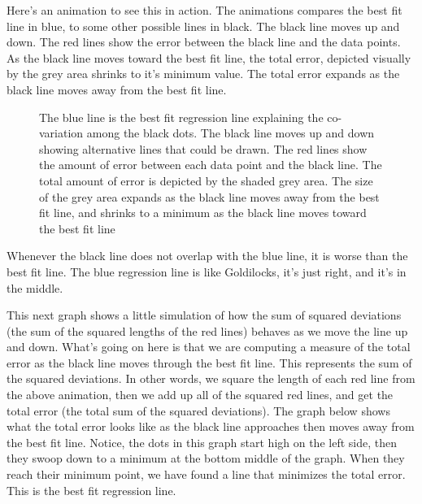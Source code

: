 \documentclass[
]{book}
\makeatletter
\newcommand*\pandocbounded[1]{%
  \sbox\pandoc@box{#1}%
  \Gscale@div\@tempa{\textheight}{\dimexpr\ht\pandoc@box+\dp\pandoc@box\relax}%
  \Gscale@div\@tempb{\linewidth}{\wd\pandoc@box}%
  \ifdim\@tempb\p@<\@tempa\p@\let\@tempa\@tempb\fi%
  \ifdim\@tempa\p@<\p@\scalebox{\@tempa}{\usebox\pandoc@box}%
  \else\usebox{\pandoc@box}%
  \fi%
}
\makeatother
\begin{document}
Here's an animation to see this in action. The animations compares the best fit line in blue, to some other possible lines in black. The black line moves up and down. The red lines show the error between the black line and the data points. As the black line moves toward the best fit line, the total error, depicted visually by the grey area shrinks to it's minimum value. The total error expands as the black line moves away from the best fit line.

\begin{figure}
\centering
\pandocbounded{\texttt{[image: gifs/regression-1.gif]}}
\caption{\label{fig:3regressionGIF}The blue line is the best fit regression line explaining the co-variation among the black dots. The black line moves up and down showing alternative lines that could be drawn. The red lines show the amount of error between each data point and the black line. The total amount of error is depicted by the shaded grey area. The size of the grey area expands as the black line moves away from the best fit line, and shrinks to a minimum as the black line moves toward the best fit line}
\end{figure}

Whenever the black line does not overlap with the blue line, it is worse than the best fit line. The blue regression line is like Goldilocks, it's just right, and it's in the middle.

This next graph shows a little simulation of how the sum of squared deviations (the sum of the squared lengths of the red lines) behaves as we move the line up and down. What's going on here is that we are computing a measure of the total error as the black line moves through the best fit line. This represents the sum of the squared deviations. In other words, we square the length of each red line from the above animation, then we add up all of the squared red lines, and get the total error (the total sum of the squared deviations). The graph below shows what the total error looks like as the black line approaches then moves away from the best fit line. Notice, the dots in this graph start high on the left side, then they swoop down to a minimum at the bottom middle of the graph. When they reach their minimum point, we have found a line that minimizes the total error. This is the best fit regression line.
\end{document}
